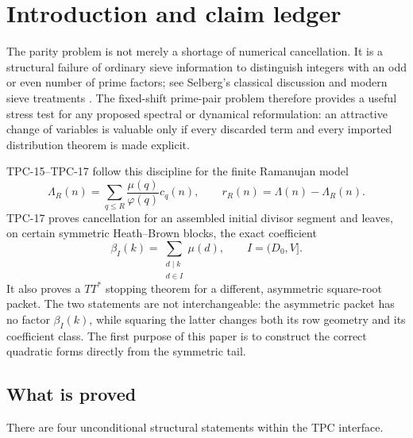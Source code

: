 \section{Introduction and claim ledger}
\label{sec:introduction}

The parity problem is not merely a shortage of numerical cancellation.
It is a structural failure of ordinary sieve information to distinguish
integers with an odd or even number of prime factors; see Selberg's
classical discussion and modern sieve treatments
\citep{Selberg1952Parity,FI2010}.  The fixed-shift prime-pair problem
therefore provides a useful stress test for any proposed spectral or
dynamical reformulation: an attractive change of variables is valuable
only if every discarded term and every imported distribution theorem
is made explicit.

TPC-15--TPC-17 follow this discipline for the finite Ramanujan model
\citep{WangTPC15,WangTPC16,WangTPC17}
\[
 \Lambda_R(n)=\sum_{q\le R}\frac{\mu(q)}{\varphi(q)}c_q(n),
 \qquad r_R(n)=\Lambda(n)-\Lambda_R(n).
\]
TPC-17 proves cancellation for an assembled initial divisor segment
and leaves, on certain symmetric Heath--Brown blocks, the exact
coefficient
\[
 \beta_I(k)=\sum_{\substack{d\mid k\\d\in I}}\mu(d),
 \qquad I=(D_0,V].
\]
It also proves a $TT^*$ stopping theorem for a different, asymmetric
square-root packet.  The two statements are not interchangeable: the
asymmetric packet has no factor $\beta_I(k)$, while squaring the latter
changes both its row geometry and its coefficient class.  The first
purpose of this paper is to construct the correct quadratic forms
directly from the symmetric tail.

\subsection{What is proved}

There are four unconditional structural statements within the TPC
interface.

